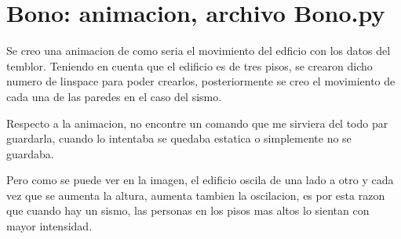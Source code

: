 \documentclass[11pt,letterpaper]{exam}
\begin{document}
\section{Bono: animacion, archivo Bono.py}
Se creo una animacion de como seria el movimiento del edficio con los datos del temblor. Teniendo en cuenta que el edificio es de tres pisos, se crearon dicho numero de linspace para poder crearlos, posteriormente se creo el movimiento de cada una de las paredes en el caso del sismo. 

Respecto a la animacion, no encontre un comando que me sirviera del todo par guardarla, cuando lo intentaba se quedaba estatica o simplemente no se guardaba.

Pero como se puede ver en la imagen, el edificio oscila de una lado a otro y cada vez que se aumenta la altura, aumenta tambien la oscilacion, es por esta razon que cuando hay un sismo, las personas en los pisos mas altos lo sientan con mayor intensidad.
\end{document}
